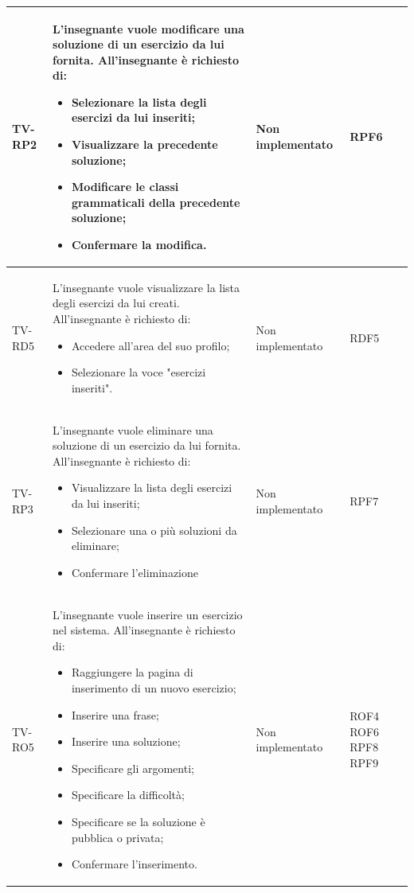 \begin{longtable}{|>{\centering\arraybackslash}m{1.6cm}|>{\centering\arraybackslash}m{6.41cm}|>{\centering\arraybackslash}m{3.1cm} | >{\centering\arraybackslash}m{2.6cm}|}
		TV-RP2 & L'insegnante vuole modificare una soluzione di un esercizio da lui fornita. All'insegnante è richiesto di: 
		\begin{itemize}
			\item Selezionare la lista degli esercizi da lui inseriti;
			\item Visualizzare la precedente soluzione;
			\item Modificare le classi grammaticali della precedente soluzione;
			\item Confermare la modifica.
		\end{itemize}& Non implementato  & RPF6 \\ \hline
		TV-RD5 & L'insegnante vuole visualizzare la lista degli esercizi da lui creati. All'insegnante è richiesto di: 
		\begin{itemize}
			\item Accedere all'area del suo profilo;
			\item Selezionare la voce "esercizi inseriti".
		\end{itemize}& Non implementato  & RDF5 \\ \hline
		  \rowcolor{LightGray}
		TV-RP3 & L'insegnante vuole eliminare una soluzione di un esercizio da lui fornita. All'insegnante è richiesto di:
		\begin{itemize}
			\item Visualizzare la lista degli esercizi da lui inseriti;
			\item Selezionare una o più soluzioni da eliminare;
			\item Confermare l'eliminazione
		\end{itemize}& Non implementato  & RPF7 \\ \hline
		TV-RO5 & L'insegnante vuole inserire un esercizio nel sistema. All'insegnante è richiesto di: 
		\begin{itemize}
			\item Raggiungere la pagina di inserimento di un nuovo esercizio;
			\item Inserire una frase;
			\item Inserire una soluzione;
			\item Specificare gli argomenti;
			\item Specificare la difficoltà;
			\item Specificare se la soluzione è pubblica o privata;
			\item Confermare l'inserimento.
		\end{itemize}& Non implementato  & ROF4 ROF6 RPF8 RPF9\\ \hline

\end{longtable}
